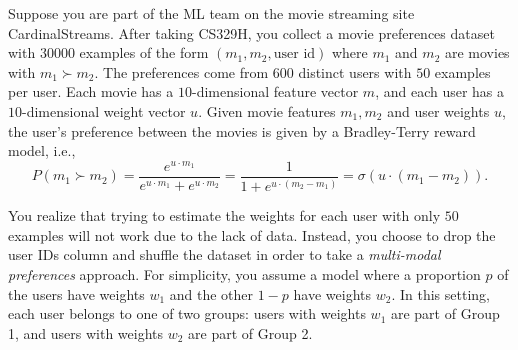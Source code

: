 \documentclass[
  letterpaper,
  numbers=noenddot,
  DIV=11,
  oneside]{scrreprt}
\theoremstyle{remark}
\begin{document}
Suppose you are part of the ML team on the movie streaming site
CardinalStreams. After taking CS329H, you collect a movie preferences
dataset with \(30000\) examples of the form
\((m_1, m_2, \text{user id})\) where \(m_1\) and \(m_2\) are movies with
\(m_1\succ m_2\). The preferences come from \(600\) distinct users with
\(50\) examples per user. Each movie has a \(10\)-dimensional feature
vector \(m\), and each user has a \(10\)-dimensional weight vector
\(u\). Given movie features \(m_1, m_2\) and user weights \(u\), the
user's preference between the movies is given by a Bradley-Terry reward
model, i.e.,
\[P(m_1\succ m_2)=\frac{e^{u\cdot m_1}}{e^{u\cdot m_1} + e^{u\cdot m_2}}=\frac{1}{1+e^{u\cdot (m_2-m_1)}}=\sigma(u\cdot (m_1-m_2)).\]

You realize that trying to estimate the weights for each user with only
\(50\) examples will not work due to the lack of data. Instead, you
choose to drop the user IDs column and shuffle the dataset in order to
take a \emph{multi-modal preferences} approach. For simplicity, you
assume a model where a proportion \(p\) of the users have weights
\(w_1\) and the other \(1-p\) have weights \(w_2\). In this setting,
each user belongs to one of two groups: users with weights \(w_1\) are
part of Group 1, and users with weights \(w_2\) are part of Group 2.
\end{document}
